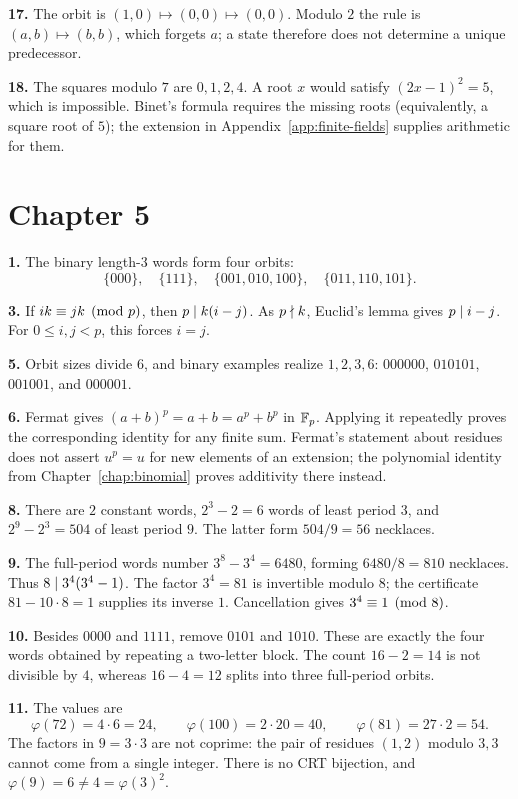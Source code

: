 \textbf{17.} The orbit is $(1,0)\mapsto(0,0)\mapsto(0,0)$.
Modulo $2$ the rule is $(a,b)\mapsto(b,b)$, which forgets $a$;
a state therefore does not determine a unique predecessor.

\textbf{18.} The squares modulo $7$ are $0,1,2,4$. A root $x$ would
satisfy $(2x-1)^2=5$, which is impossible. Binet's formula requires
the missing roots (equivalently, a square root of $5$); the extension
in Appendix~\ref{app:finite-fields} supplies arithmetic for them.

\section*{Chapter 5}

\textbf{1.} The binary length-$3$ words form four orbits:
\[
\{000\},\quad\{111\},\quad\{001,010,100\},\quad\{011,110,101\}.
\]

\textbf{3.} If $ik\equiv jk\pmod p$, then $p\mid k(i-j)$. As $p\nmid k$, Euclid's lemma gives $p\mid i-j$. For $0\le i,j<p$, this forces $i=j$.

\textbf{5.} Orbit sizes divide $6$, and binary examples realize $1,2,3,6$: $000000$, $010101$, $001001$, and $000001$.

\textbf{6.} Fermat gives $(a+b)^p=a+b=a^p+b^p$ in $\mathbb F_p$.
Applying it repeatedly proves the corresponding identity for any finite
sum. Fermat's statement about residues does not assert $u^p=u$ for
new elements of an extension; the polynomial identity from
Chapter~\ref{chap:binomial} proves additivity there instead.

\textbf{8.} There are $2$ constant words, $2^3-2=6$ words of least
period $3$, and $2^9-2^3=504$ of least period $9$. The latter form
$504/9=56$ necklaces.

\textbf{9.} The full-period words number $3^8-3^4=6480$, forming
$6480/8=810$ necklaces. Thus $8\mid3^4(3^4-1)$.
The factor $3^4=81$ is invertible modulo $8$; the certificate
$81-10\cdot8=1$ supplies its inverse $1$. Cancellation gives
$3^4\equiv1\pmod8$.

\textbf{10.} Besides $0000$ and $1111$, remove $0101$ and $1010$.
These are exactly the four words obtained by repeating a two-letter
block. The count $16-2=14$ is not divisible by $4$, whereas
$16-4=12$ splits into three full-period orbits.

\textbf{11.} The values are
\[
 \varphi(72)=4\cdot6=24,\qquad
 \varphi(100)=2\cdot20=40,\qquad
 \varphi(81)=27\cdot2=54.
\]
The factors in $9=3\cdot3$ are not coprime: the pair of residues
$(1,2)$ modulo $3,3$ cannot come from a single integer. There is no
CRT bijection, and $\varphi(9)=6\ne4=\varphi(3)^2$.

